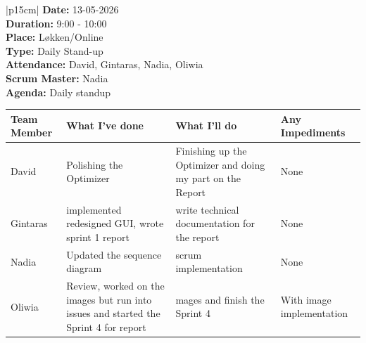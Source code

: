 \begin{table}[H]
    \centering
    \begin{tabular}{|p{15cm}|}   
        \hline
        \textbf{Date:}  13-05-2026 \\
        \textbf{Duration:}  9:00 - 10:00 \\
        \textbf{Place:}  Løkken/Online \\
        \textbf{Type:} Daily Stand-up \\
        \textbf{Attendance:} David, Gintaras, Nadia, Oliwia \\
        \textbf{Scrum Master:}  Nadia \\
        \textbf{Agenda:} Daily standup
        \begin{table}[H]
            \begin{tabular}{|p{1.75cm}|p{4cm}|p{4cm}|p{4cm}|}
                \hline
                \cellcolor[HTML]{BFBFBF}  \textbf{Team Member} & \cellcolor[HTML]{BFBFBF}  \textbf{What I've done} & \cellcolor[HTML]{BFBFBF}  \textbf{What I'll do} & \cellcolor[HTML]{BFBFBF}  \textbf{Any Impediments}\\
                \hline
                \cellcolor[HTML]{d4d4d4} David & Polishing the Optimizer & Finishing up the Optimizer and doing my part on the Report & None \\
                \hline
                \cellcolor[HTML]{d4d4d4} Gintaras & implemented redesigned GUI, wrote sprint 1 report & write technical documentation for the report & None \\
                \hline
                \cellcolor[HTML]{d4d4d4} Nadia & Updated the sequence diagram & scrum implementation & None \\
                \hline
                \cellcolor[HTML]{d4d4d4} Oliwia & Review, worked on the images but run into issues and started the Sprint 4 for report & mages and finish the Sprint 4 & With image implementation \\
                \hline
            \end{tabular}
        \end{table} \\
        \hline
    \end{tabular}
\end{table}

